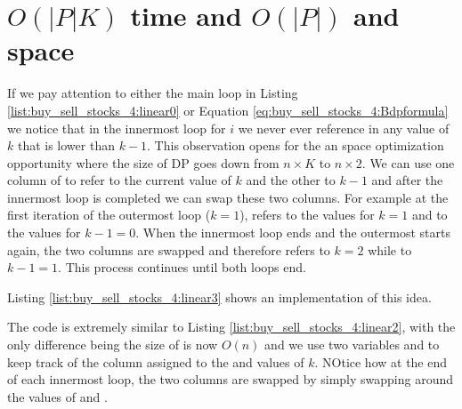 \section{$O(|P|K)$ time  and $O(|P|)$ and space}
If we pay attention to either the main loop in Listing \ref{list:buy_sell_stocks_4:linear0} or Equation \ref{eq:buy_sell_stocks_4:Bdpformula} we notice that in the innermost loop for $i$ we never ever reference in  any value of $k$ that is lower than $k-1$. This observation opens for the an space optimization opportunity where the size of DP goes down from  $n\times K$ to $n\times 2$. 
We can use one column of  to refer to the current value of $k$ and the other to $k-1$ and after the innermost loop is completed we can swap these two columns. For example at the first iteration of the outermost loop ($k=1$),  refers to the values for $k=1$ and  to the values for $k-1=0$. 
When the innermost loop ends  and the outermost starts again, the two columns are swapped and therefore  refers to $k=2$ while   to $k-1=1$. This process continues until both loops end.

Listing \ref{list:buy_sell_stocks_4:linear3} shows an implementation of this idea.



The code is extremely similar to Listing \ref{list:buy_sell_stocks_4:linear2}, with the only difference being the size of  is now $O(n)$ and we use two variables  and  to keep track of the column assigned to the  and  values of $k$. 
NOtice how at the end of each innermost loop, the two columns are swapped by simply swapping around the values of  and .
